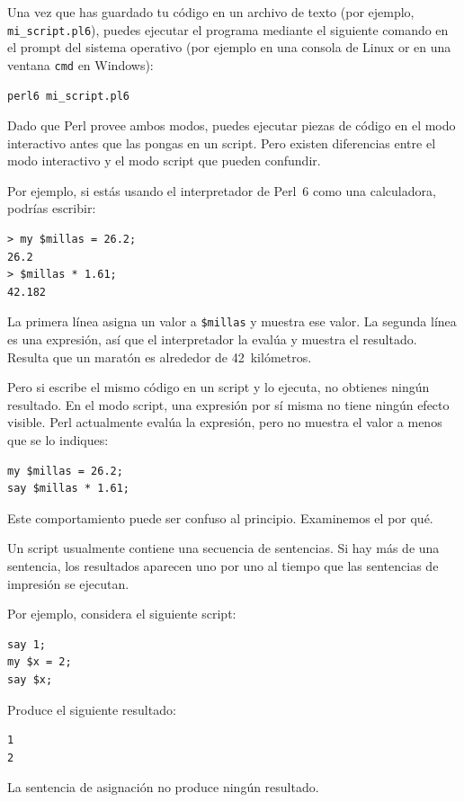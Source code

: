 Una vez que has guardado tu código en un archivo de texto (por ejemplo,
\verb|mi_script.pl6|), puedes ejecutar el programa mediante el siguiente
comando en el prompt del sistema operativo (por ejemplo en una consola de 
Linux or en una ventana \verb|cmd| en Windows):
\begin{verbatim}
perl6 mi_script.pl6
\end{verbatim}

Dado que Perl provee ambos modos, 
puedes ejecutar piezas de código en el modo interactivo 
antes que las pongas en un script. Pero existen diferencias entre 
el modo interactivo y el modo script que pueden confundir.

Por ejemplo, si estás usando el interpretador de Perl~6 como una
calculadora, podrías escribir:

\begin{verbatim}
> my $millas = 26.2;
26.2
> $millas * 1.61;
42.182
\end{verbatim}

La primera línea asigna un valor a {\tt \$millas} y muestra ese valor.
La segunda línea es una expresión, así que el interpretador la evalúa
y muestra el resultado. Resulta que un maratón es alrededor de 42~kilómetros.

Pero si escribe el mismo código en un script y lo ejecuta, no obtienes
ningún resultado. En el modo script, una expresión por sí misma no tiene
ningún efecto visible. Perl actualmente evalúa la expresión, pero no muestra
el valor a menos que se lo indiques:

\begin{verbatim}
my $millas = 26.2;
say $millas * 1.61;
\end{verbatim}

Este comportamiento puede ser confuso al principio. Examinemos
el por qué.

Un script usualmente contiene una secuencia de sentencias. Si hay más 
de una sentencia, los resultados aparecen uno por uno al 
tiempo que las sentencias de impresión se ejecutan.

Por ejemplo, considera el siguiente script:

\begin{verbatim}
say 1;
my $x = 2;
say $x;
\end{verbatim}
%
Produce el siguiente resultado:

\begin{verbatim}
1
2
\end{verbatim}
%
La sentencia de asignación no produce ningún resultado.

